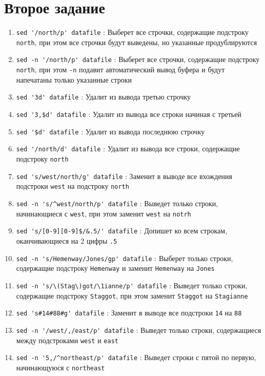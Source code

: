 \documentclass[12pt, a4paper]{article}
\begin{document}
\section*{Второе задание}
\begin{enumerate}
  \item \verb|sed '/north/p' datafile| : Выберет все строчки, содержащие подстроку
    \verb|north|, при этом все строчки будут выведены, но указанные продублируются
  \item \verb|sed -n '/north/p' datafile| : Выберет все строчки, содержащие
    подстроку \verb|north|, при этом \verb|-n| подавит автоматический вывод буфера
    и будут напечатаны только указанные строки
  \item \verb|sed '3d' datafile| : Удалит из вывода третью строчку
  \item \verb|sed '3,$d' datafile| : Удалит из вывода все строки начиная с третьей
  \item \verb|sed '$d' datafile| : Удалит из вывода последнюю строчку
  \item \verb|sed '/north/d' datafile| : Удалит из вывода все строки, содержащие
    подстроку \verb|north|
  \item \verb|sed 's/west/north/g' datafile| : Заменит в выводе все вхождения
    подстроки \verb|west| на подстроку \verb|north|
  \item \verb|sed -n 's/^west/north/p' datafile| : Выведет только строки,
    начинающиеся с \verb|west|, при этом заменит \verb|west| на \verb|notrh|
  \item \verb|sed 's/[0-9][0-9]$/&.5/' datafile| : Допишет ко всем строкам,
    оканчивающиеся на 2 цифры \verb|.5|
  \item \verb|sed -n 's/Hemenway/Jones/gp' datafile| : Выберет только строки,
    содержащие подстроку \verb|Hemenway| и заменит \verb|Hemenway| на
    \verb|Jones|
  \item \verb|sed -n 's/\(Stag\)got/\1ianne/p' datafile| : Выведет только
    строки, содержащие подстроку \verb|Staggot|, при этом заменит \verb|Staggot|
    на \verb|Stagianne|
  \item \verb|sed 's#14#88#g' datafile| : Заменит в выводе все подстроки
    \verb|14| на \verb|88|
  \item \verb|sed -n '/west/,/east/p' datafile| : Выведет только строки,
    содержащиеся между подстроками \verb|west| и \verb|east|
  \item \verb|sed -n '5,/^northeast/p' datafile| : Выведет строки с пятой по
    первую, начинающуюся с \verb|northeast|

\end{enumerate}
\end{document}
